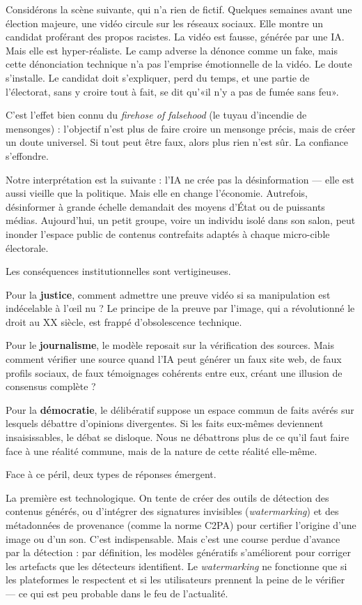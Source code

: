 Considérons la scène suivante, qui n'a rien de fictif. Quelques semaines avant une élection majeure, une vidéo circule sur les réseaux sociaux. Elle montre un candidat proférant des propos racistes. La vidéo est fausse, générée par une IA. Mais elle est hyper-réaliste. Le camp adverse la dénonce comme un fake, mais cette dénonciation technique n'a pas l'emprise émotionnelle de la vidéo. Le doute s'installe. Le candidat doit s'expliquer, perd du temps, et une partie de l'électorat, sans y croire tout à fait, se dit qu'«il n'y a pas de fumée sans feu».

C'est l'effet bien connu du \emph{firehose of falsehood} (le tuyau d'incendie de mensonges) : l'objectif n'est plus de faire croire un mensonge précis, mais de créer un doute universel. Si tout peut être faux, alors plus rien n'est sûr. La confiance s'effondre.

Notre interprétation est la suivante : l'IA ne crée pas la désinformation — elle est aussi vieille que la politique. Mais elle en change l'économie. Autrefois, désinformer à grande échelle demandait des moyens d'État ou de puissants médias. Aujourd'hui, un petit groupe, voire un individu isolé dans son salon, peut inonder l'espace public de contenus contrefaits adaptés à chaque micro-cible électorale.

Les conséquences institutionnelles sont vertigineuses.

Pour la \textbf{justice}, comment admettre une preuve vidéo si sa manipulation est indécelable à l'œil nu ? Le principe de la preuve par l'image, qui a révolutionné le droit au XX siècle, est frappé d'obsolescence technique.

Pour le \textbf{journalisme}, le modèle reposait sur la vérification des sources. Mais comment vérifier une source quand l'IA peut générer un faux site web, de faux profils sociaux, de faux témoignages cohérents entre eux, créant une illusion de consensus complète ?

Pour la \textbf{démocratie}, le délibératif suppose un espace commun de faits avérés sur lesquels débattre d'opinions divergentes. Si les faits eux-mêmes deviennent insaisissables, le débat se disloque. Nous ne débattrons plus de ce qu'il faut faire face à une réalité commune, mais de la nature de cette réalité elle-même.

Face à ce péril, deux types de réponses émergent.

La première est technologique. On tente de créer des outils de détection des contenus générés, ou d'intégrer des signatures invisibles (\emph{watermarking}) et des métadonnées de provenance (comme la norme C2PA) pour certifier l'origine d'une image ou d'un son. C'est indispensable. Mais c'est une course perdue d'avance par la détection : par définition, les modèles génératifs s'améliorent pour corriger les artefacts que les détecteurs identifient. Le \emph{watermarking} ne fonctionne que si les plateformes le respectent et si les utilisateurs prennent la peine de le vérifier — ce qui est peu probable dans le feu de l'actualité.

